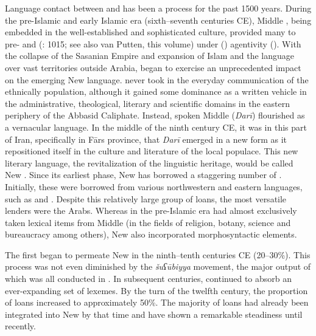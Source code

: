 \documentclass[output=paper]{langsci/langscibook}
\begin{document}
Language contact between  and  has been a  process for the past 1500 years. During the pre-Islamic and early Islamic era (sixth–seventh centuries CE), Middle , being embedded in the well-established and sophisticated  culture, provided many  to pre- and   (\citealt{Gazsi2011}: 1015; see also van Putten, this volume) under  () agentivity (\citealt{VanCoetsem1988,VanCoetsem2000}). With the collapse of the Sasanian Empire and expansion of Islam and the  language over vast territories outside Arabia,   began to exercise an unprecedented impact on the emerging New  language.  never took  in the everyday communication of the ethnically  population, although it gained some dominance as a written vehicle in the administrative, theological, literary and scientific domains in the eastern periphery of the Abbasid Caliphate. Instead, spoken Middle  (\textit{Darī}) flourished as a vernacular language. In the middle of the ninth century CE, it was in this part of Iran, specifically in Fārs province, that \textit{Darī} emerged in a new form as it repositioned itself in the culture and literature of the local populace. This new literary language, the revitalization of the  linguistic heritage, would be called New . Since its earliest phase, New  has borrowed a staggering number of . Initially, these  were borrowed from various northwestern and eastern  languages, such as  and . Despite this relatively large group of loans, the most versatile lenders were the Arabs. Whereas in the pre-Islamic era  had almost exclusively taken lexical items from Middle  (in the fields of religion, botany, science and bureaucracy among others), New  also incorporated  morphosyntactic elements.

The first   began to permeate New  in the ninth–tenth centuries CE (20–30\%). This process was not even diminished by the  \textit{šuʕūbiyya} movement, the major output of which was all conducted in . In subsequent centuries,  continued to absorb an ever-expanding set of  lexemes. By the turn of the twelfth century, the proportion of  loans increased to approximately 50\%. The majority of  loans had already been integrated into New  by that time and have shown a remarkable steadiness until recently.
\end{document}
